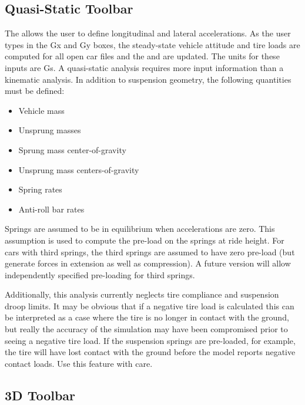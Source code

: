 \subsection{Quasi-Static Toolbar} \label{ssec:quasiStaticToolbar}

The  allows the user to define longitudinal and lateral accelerations.  As the user types in the Gx and Gy boxes, the steady-state vehicle attitude and tire loads are computed for all open car files and the  and  are updated.  The units for these inputs are Gs.  A quasi-static analysis requires more input information than a kinematic analysis.  In addition to suspension geometry, the following quantities must be defined:

\begin{itemize}
\item Vehicle mass
\item Unsprung masses
\item Sprung mass center-of-gravity
\item Unsprung mass centers-of-gravity
\item Spring rates
\item Anti-roll bar rates
\end{itemize}

Springs are assumed to be in equilibrium when accelerations are zero.  This assumption is used to compute the pre-load on the springs at ride height.  For cars with third springs, the third springs are assumed to have zero pre-load (but generate forces in extension as well as compression).  A future version will allow independently specified pre-loading for third springs.

Additionally, this analysis currently neglects tire compliance and suspension droop limits.  It may be obvious that if a negative tire load is calculated this can be interpreted as a case where the tire is no longer in contact with the ground, but really the accuracy of the simulation may have been compromised prior to seeing a negative tire load.  If the suspension springs are pre-loaded, for example, the tire will have lost contact with the ground before the model reports negative contact loads.  Use this feature with care.

\subsection{3D Toolbar} \label{ssec:3DToolbar}

